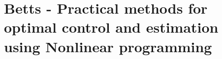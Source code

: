 \section{Betts - Practical methods for optimal control and estimation using Nonlinear programming \cite{betts2010practical}}